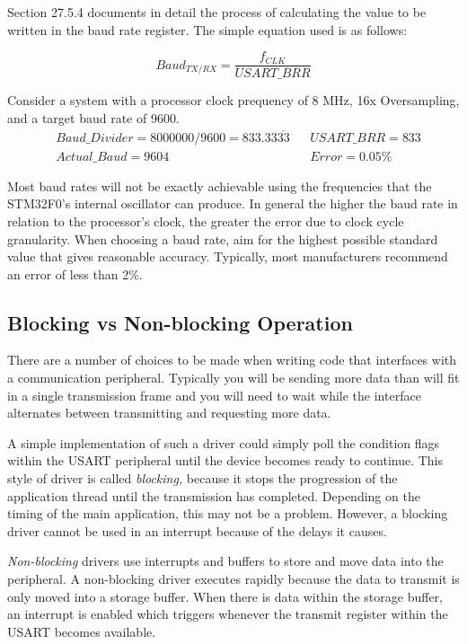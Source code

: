 \documentclass[openany,11pt,fleqn]{book} %
\begin{document}
Section 27.5.4 documents in detail the process of calculating the value to be written in the baud rate register. The simple equation used is as follows:

\begin{equation*}
Baud_{TX/RX} = \frac{f_{CLK}}{USART\_BRR}
\end{equation*}



\begin{example}
    Consider a system with a processor clock prequency of 8 MHz, 16x Oversampling, and a target baud rate of 9600.  
    \begin{align*}
    & Baud\_Divider = 8000000/9600 = 833.33\overline{33} & & USART\_BRR = 833\\[0.25em]
    & Actual\_Baud = 9604 & & Error = 0.05 \%
    \end{align*}
    
\end{example}
    
Most baud rates will not be exactly achievable using the frequencies that the STM32F0's internal oscillator can produce. In general the higher the baud rate in relation to the processor's clock, the greater the error due to clock cycle granularity. When choosing a baud rate, aim for the highest possible standard value that gives reasonable accuracy. Typically, most manufacturers recommend an error of less than 2\%. 


\subsection{Blocking vs Non-blocking Operation}
There are a number of choices to be made when writing code that interfaces with a communication peripheral. Typically you will be sending more data than will fit in a single transmission frame and you will need to wait while the interface alternates between transmitting and requesting more data.

A simple implementation of such a driver could simply poll the condition flags within the USART peripheral until the device becomes ready to continue. This style of driver is called \textit{blocking,} because it stops the progression of the application thread until the transmission has completed. Depending on the timing of the main application, this may not be a problem. However, a blocking driver cannot be used in an interrupt because of the delays it causes. 

\textit{Non-blocking} drivers use interrupts and buffers to store and move data into the peripheral. A non-blocking driver executes rapidly because the data to transmit is only moved into a storage buffer. When there is data within the storage buffer, an interrupt is enabled which triggers whenever the transmit register within the USART becomes available. 
\end{document}
